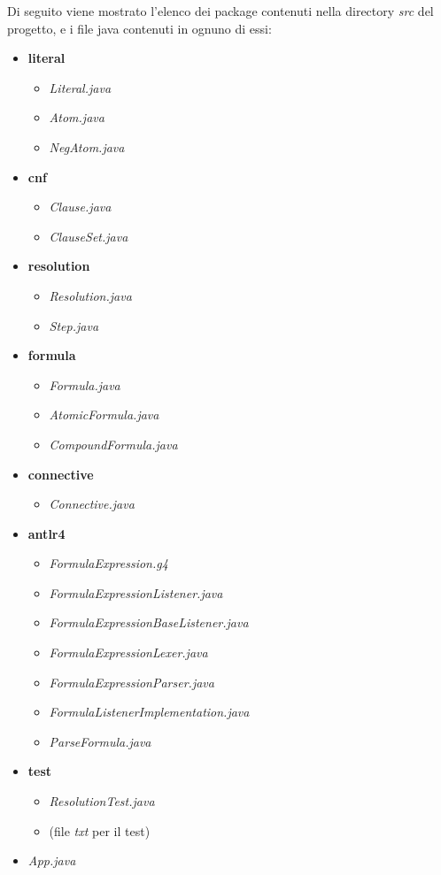 \documentclass[a4paper,12pt]{report}
\begin{document}
Di seguito viene mostrato l'elenco dei package contenuti nella directory \emph{src} del progetto, e i file java contenuti in ognuno di essi:
\begin{itemize}
    \item \textbf{literal}
        \begin{itemize}
            \item \emph{Literal.java}
            \item \emph{Atom.java}
            \item \emph{NegAtom.java}
        \end{itemize}
    \item \textbf{cnf}
        \begin{itemize}
            \item \emph{Clause.java}
            \item \emph{ClauseSet.java}
        \end{itemize}
    \item \textbf{resolution}
        \begin{itemize}
            \item \emph{Resolution.java}
            \item \emph{Step.java}
        \end{itemize}
    \item \textbf{formula}
        \begin{itemize}
            \item \emph{Formula.java}
            \item \emph{AtomicFormula.java}
            \item \emph{CompoundFormula.java}
        \end{itemize}
    \item \textbf{connective}
        \begin{itemize}
            \item \emph{Connective.java}
        \end{itemize}
    \item \textbf{antlr4}
        \begin{itemize}
            \item \emph{FormulaExpression.g4}
            \item \emph{FormulaExpressionListener.java}
            \item \emph{FormulaExpressionBaseListener.java}
            \item \emph{FormulaExpressionLexer.java}
            \item \emph{FormulaExpressionParser.java}
            \item \emph{FormulaListenerImplementation.java}
            \item \emph{ParseFormula.java}
        \end{itemize}
    \item \textbf{test}
        \begin{itemize}
            \item \emph{ResolutionTest.java}
            \item (file \emph{txt} per il test)
        \end{itemize}
    \item \emph{App.java}
\end{itemize}
\end{document}
